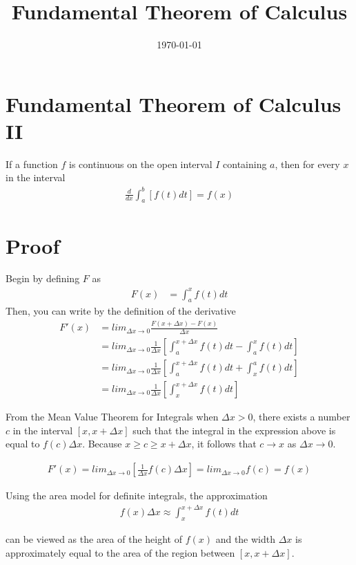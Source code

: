 \documentclass[a4paper, 12pt]{article}
\begin{document}
\title{Fundamental Theorem of Calculus}
\date{\today}
\pagestyle{empty} 
\section{Fundamental Theorem of Calculus II}
	If a function $f$ is continuous on the open interval $I$ containing $a$, then for every $x$ in the interval
\begin{align}
	\frac{d}{dx} \int_a^b [f(t) dt] = f(x)
\end{align}
\section{Proof}
	Begin by defining $F$ as
\begin{align}
	F(x) &= \int_a^x f(t) dt
\end{align}
	Then, you can write by the definition of the derivative
\begin{align*}
	F'(x) &= lim_{\Delta x \to 0} \frac{F(x + \Delta x) - F(x)}{\Delta x} \\
		  &= lim_{\Delta x \to 0} \frac{1}{\Delta x} [\int_{a}^{x + \Delta x} f(t) dt - \int_a^x f(t) dt ] \\
		  &=  lim_{\Delta x \to 0} \frac{1}{\Delta x} [\int_{a}^{x + \Delta x} f(t) dt + \int_x^a f(t) dt ] \\
		  &=  lim_{\Delta x \to 0} \frac{1}{\Delta x} [\int_{x}^{x + \Delta x} f(t) dt]
\end{align*}

	From the Mean Value Theorem for Integrals when $\Delta x > 0$, there exists a number $c$ in the interval $[x, x + \Delta x]$ such that the integral in the expression above is equal to $f(c) \Delta x$.  Because $x \geq c \geq x + \Delta x$, it follows that $c \to x$ as $\Delta x \to 0$.
	
\begin{align*}
	F'(x) = lim_{\Delta x \to 0} [\frac{1}{\Delta x} f(c) \Delta x ] = lim_{\Delta x \to 0} f(c) = f(x)
\end{align*}

	Using the area model for definite integrals, the approximation
\begin{align}
	f(x) \Delta x \approx \int_{x}^{x + \Delta x} f(t) dt
\end{align}	

	can be viewed as the area of the height of $f(x)$ and the width $\Delta x$ is approximately equal to the area of the region between $[x, x + \Delta x]$.
\end{document}
